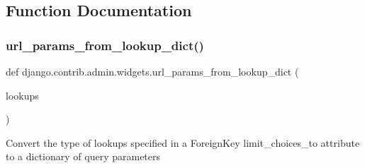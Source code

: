 \subsection{Function Documentation}
\mbox{\label{namespacedjango_1_1contrib_1_1admin_1_1widgets_aa99daa950f5ab57637ccca6d1dfe0b9c}} 
\subsubsection{\texorpdfstring{url\+\_\+params\+\_\+from\+\_\+lookup\+\_\+dict()}{url\_params\_from\_lookup\_dict()}}
{\footnotesize\ttfamily def django.\+contrib.\+admin.\+widgets.\+url\+\_\+params\+\_\+from\+\_\+lookup\+\_\+dict (\begin{DoxyParamCaption}\item[{}]{lookups }\end{DoxyParamCaption})}

\begin{DoxyVerb}Convert the type of lookups specified in a ForeignKey limit_choices_to
attribute to a dictionary of query parameters
\end{DoxyVerb}
 